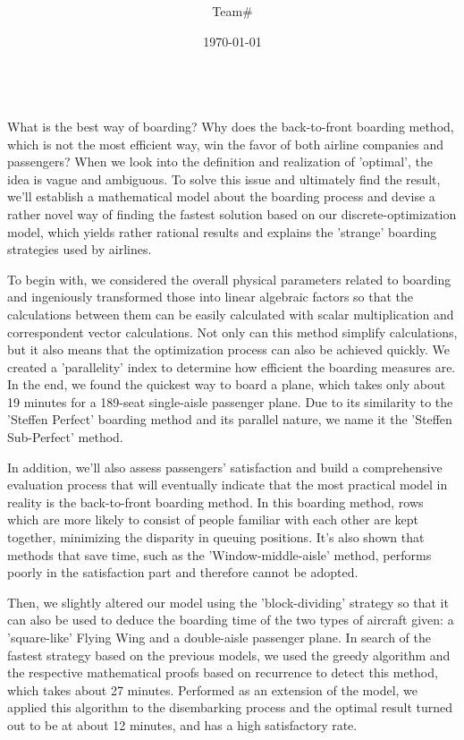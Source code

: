 \documentclass{article}
\title{\Huge\textbf{\Title}}
\author{Team\#\Team}
\date{\today}
\theoremstyle{definition}
\theoremstyle{remark}
\numberwithin{equation}{section}
\begin{document}
	\normalfont{}\selectfont

	\qquad
	\par
	~~
	\\[1.5cm]

	What is the best way of boarding? Why does the back-to-front boarding method, which is not the most efficient way, win the favor of both airline companies and passengers? When we look into the definition and realization of 'optimal', the idea is vague and ambiguous. To solve this issue and ultimately find the result, we'll establish a mathematical model about the boarding process and devise a rather novel way of finding the fastest solution based on our discrete-optimization model, which yields rather rational results and explains the 'strange' boarding strategies used by airlines.

	To begin with, we considered the overall physical parameters related to boarding and ingeniously transformed those into linear algebraic factors so that the calculations between them can be easily calculated with scalar multiplication and correspondent vector calculations. Not only can this method simplify calculations, but it also means that the optimization process can also be achieved quickly. We created a 'parallelity' index to determine how efficient the boarding measures are. In the end, we found the quickest way to board a plane, which takes only about 19 minutes for a 189-seat single-aisle passenger plane. Due to its similarity to the 'Steffen Perfect' boarding method and its parallel nature, we name it the 'Steffen Sub-Perfect' method.

	In addition, we'll also assess passengers' satisfaction and build a comprehensive evaluation process that will eventually indicate that the most practical model in reality is the back-to-front boarding method. In this boarding method, rows which are more likely to consist of people familiar with each other are kept together, minimizing the disparity in queuing positions. It's also shown that methods that save time, such as the 'Window-middle-aisle' method, performs poorly in the satisfaction part and therefore cannot be adopted.

	Then, we slightly altered our model using the 'block-dividing' strategy so that it can also be used to deduce the boarding time of the two types of aircraft given: a 'square-like' Flying Wing and a double-aisle passenger plane. In search of the fastest strategy based on the previous models, we used the greedy algorithm and the respective mathematical proofs based on recurrence to detect this method, which takes about 27 minutes. Performed as an extension of the model, we applied this algorithm to the disembarking process and the optimal result turned out to be at about 12 minutes, and has a high satisfactory rate.
\end{document}
